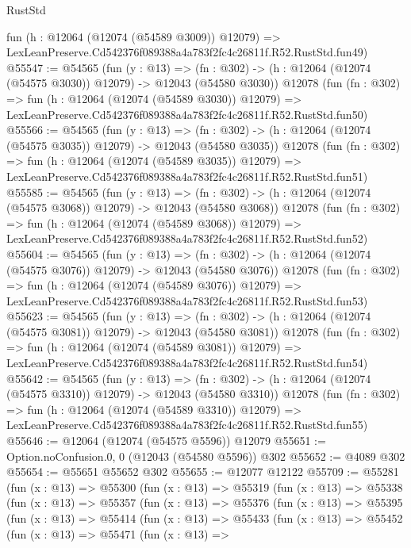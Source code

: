 \begin{lexlean}{RustStd}
\begin{coremodule}
    fun (h : @12064 (@12074 (@54589 @3009)) @12079) =>
    LexLeanPreserve.Cd542376f089388a4a783f2fc4c26811f.R52.RustStd.fun49)
@55547 := @54565
    (fun (y : @13) =>
    (fn : @302) -> (h : @12064 (@12074 (@54575 @3030)) @12079) -> @12043 (@54580 @3030))
    @12078
    (fun (fn : @302) =>
    fun (h : @12064 (@12074 (@54589 @3030)) @12079) =>
    LexLeanPreserve.Cd542376f089388a4a783f2fc4c26811f.R52.RustStd.fun50)
@55566 := @54565
    (fun (y : @13) =>
    (fn : @302) -> (h : @12064 (@12074 (@54575 @3035)) @12079) -> @12043 (@54580 @3035))
    @12078
    (fun (fn : @302) =>
    fun (h : @12064 (@12074 (@54589 @3035)) @12079) =>
    LexLeanPreserve.Cd542376f089388a4a783f2fc4c26811f.R52.RustStd.fun51)
@55585 := @54565
    (fun (y : @13) =>
    (fn : @302) -> (h : @12064 (@12074 (@54575 @3068)) @12079) -> @12043 (@54580 @3068))
    @12078
    (fun (fn : @302) =>
    fun (h : @12064 (@12074 (@54589 @3068)) @12079) =>
    LexLeanPreserve.Cd542376f089388a4a783f2fc4c26811f.R52.RustStd.fun52)
@55604 := @54565
    (fun (y : @13) =>
    (fn : @302) -> (h : @12064 (@12074 (@54575 @3076)) @12079) -> @12043 (@54580 @3076))
    @12078
    (fun (fn : @302) =>
    fun (h : @12064 (@12074 (@54589 @3076)) @12079) =>
    LexLeanPreserve.Cd542376f089388a4a783f2fc4c26811f.R52.RustStd.fun53)
@55623 := @54565
    (fun (y : @13) =>
    (fn : @302) -> (h : @12064 (@12074 (@54575 @3081)) @12079) -> @12043 (@54580 @3081))
    @12078
    (fun (fn : @302) =>
    fun (h : @12064 (@12074 (@54589 @3081)) @12079) =>
    LexLeanPreserve.Cd542376f089388a4a783f2fc4c26811f.R52.RustStd.fun54)
@55642 := @54565
    (fun (y : @13) =>
    (fn : @302) -> (h : @12064 (@12074 (@54575 @3310)) @12079) -> @12043 (@54580 @3310))
    @12078
    (fun (fn : @302) =>
    fun (h : @12064 (@12074 (@54589 @3310)) @12079) =>
    LexLeanPreserve.Cd542376f089388a4a783f2fc4c26811f.R52.RustStd.fun55)
@55646 := @12064 (@12074 (@54575 @5596)) @12079
@55651 := Option.noConfusion.{0, 0} (@12043 (@54580 @5596)) @302
@55652 := @4089 @302
@55654 := @55651 @55652 @302
@55655 := @12077 @12122
@55709 := @55281
    (fun (x : @13) =>
    @55300
      (fun (x : @13) =>
      @55319
        (fun (x : @13) =>
        @55338
          (fun (x : @13) =>
          @55357
            (fun (x : @13) =>
            @55376
              (fun (x : @13) =>
              @55395
                (fun (x : @13) =>
                @55414
                  (fun (x : @13) =>
                  @55433
                    (fun (x : @13) =>
                    @55452
                      (fun (x : @13) =>
                      @55471
                        (fun (x : @13) =>

\end{coremodule}
\end{lexlean}
